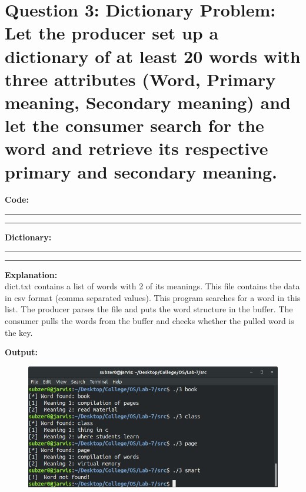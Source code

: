 \documentclass{article}
\begin{document}
\section*{Question 3: Dictionary Problem: Let the producer set up a dictionary of at least 20 words with three attributes (Word, Primary meaning, Secondary meaning) and let the consumer search for the word and retrieve its respective primary and secondary meaning.}
\bigskip

\par\noindent
\textbf{\Large Code: }
\smallskip
\par\noindent\rule{\textwidth}{0.4pt}

\par\noindent\rule{\textwidth}{0.4pt}
\bigskip

\par\noindent
\textbf{\Large Dictionary: }
\smallskip
\par\noindent\rule{\textwidth}{0.4pt}

\par\noindent\rule{\textwidth}{0.4pt}

\bigskip
\noindent
\textbf{\Large Explanation: } \\

dict.txt contains a list of words with 2 of its meanings. This file contains the data in csv format (comma separated values).
This program searches for a word in this list. The producer parses the file and puts the word structure in the buffer.
The consumer pulls the words from the buffer and checks whether the pulled word is the key. 

\bigskip
\noindent
\textbf{\Large Output:}

\begin{figure}[h]
	\includegraphics[width=\textwidth]{output/3.png}
\end{figure}
\bigskip
\end{document}
